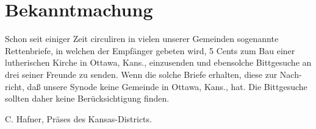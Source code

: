 \chapter{Bekanntmachung}

Schon seit einiger Zeit circuliren in vielen unserer Gemeinden sogenannte Rettenbriefe, in welchen der Empfänger gebeten wird, 5 Cents zum Bau einer lutherischen Kirche in Ottawa, Kans., einzusenden und ebensolche Bittgesuche an drei seiner Freunde zu senden. Wenn die solche Briefe erhalten, diese zur Nach-richt, daß unsere Synode keine Gemeinde in Ottawa, Kans., hat. Die Bittgesuche sollten daher keine Berücksichtigung finden.

C. Hafner,
Präses des Kansas-Districts.
